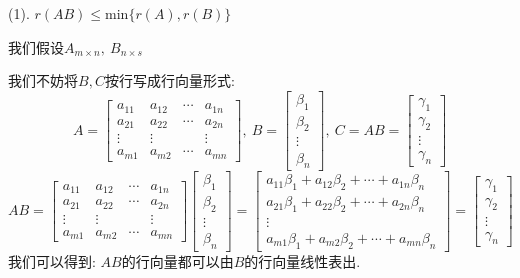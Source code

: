 \begin{anymark}[证明]
(1). $r(AB)\leq \text{min}\{r(A),r(B)\}$

我们假设$A_{m\times n},\ B_{n\times s}$

我们不妨将$B,C$按行写成行向量形式:  
$$A=\left[
\begin{matrix}
	a_{11}&a_{12}&\cdots&a_{1n}\\
	a_{21}&a_{22}&\cdots&a_{2n}\\
	\vdots&\vdots& &\vdots\\
	a_{m1}&a_{m2}&\cdots&a_{mn}
\end{matrix}
\right],\ B=\left[
\begin{matrix}
	\beta_{1}\\
	\beta_{2}\\
	\vdots\\
	\beta_{n}
\end{matrix}
\right],\ C=AB=\left[
\begin{matrix}
	\gamma_{1}\\
	\gamma_{2}\\
	\vdots\\
	\gamma_{n}
\end{matrix}
\right]$$
$$AB=\left[
\begin{matrix}
	a_{11}&a_{12}&\cdots&a_{1n}\\
	a_{21}&a_{22}&\cdots&a_{2n}\\
	\vdots&\vdots& &\vdots\\
	a_{m1}&a_{m2}&\cdots&a_{mn}
\end{matrix}
\right]\left[
\begin{matrix}
	\beta_{1}\\
	\beta_{2}\\
	\vdots\\
	\beta_{n}
\end{matrix}
\right]=\left[
\begin{matrix}
	a_{11}\beta_{1}+a_{12}\beta_{2}+\cdots+a_{1n}\beta_{n}\\
	a_{21}\beta_{1}+a_{22}\beta_{2}+\cdots+a_{2n}\beta_{n}\\
	\vdots\\
	a_{m1}\beta_{1}+a_{m2}\beta_{2}+\cdots+a_{mn}\beta_{n}
\end{matrix}
\right]=\left[
\begin{matrix}
	\gamma_{1}\\
	\gamma_{2}\\
	\vdots\\
	\gamma_{n}
\end{matrix}
\right]$$
我们可以得到:  $AB\text{的行向量都可以由}B\text{的行向量线性表出}.$

\end{anymark}

